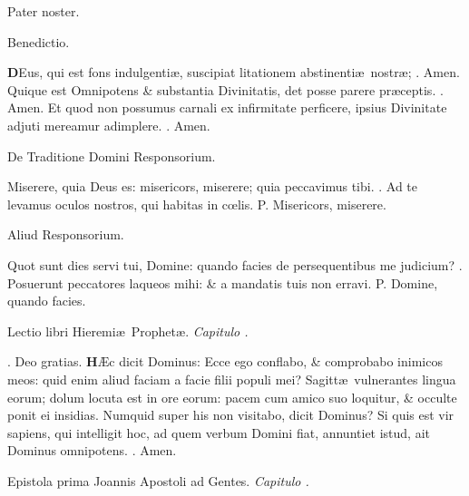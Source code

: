 \documentclass[letter,11pt]{book}
\makeatletter
\DeclareRobustCommand{\Vbar}{\vers@resp{-0.1em}{V}}
\DeclareRobustCommand{\Rbar}{\vers@resp{0pt}{R}}
\newcommand{\vers@resp@sym}{\raisebox{0.2ex}{\rotatebox[origin=c]{-20}{$\m@th\rceil$}}}
\newcommand{\vers@resp}[2]{%
  {\ooalign{\hidewidth\kern#1\vers@resp@sym\hidewidth\cr#2\cr}}%
}%
\def\P{\color{Red} P. \color{black}}
\def\V{\color{Red} \Vbar . \color{black}}
\def\R{\color{Red} \Rbar . \color{black}}
\makeatother
\begin{document}
\begin{multicols*}{2}
\par Pater noster.
\vspace{-.5em} \begin{center} \color{Red} Benedictio. \end{center} \vspace{-.5em}
\lettrine[lines=2]{\bfseries \color{Red} D}{}Eus, qui est fons indulgenti\ae , suscipiat litationem abstinenti\ae \ nostr\ae ;
\R Amen. Quique est Omnipotens \& substantia Divinitatis, det posse parere pr\ae ceptis. \R Amen. Et quod non possumus carnali ex infirmitate perficere, ipsius Divinitate adjuti mereamur adimplere. \R Amen.
\vspace{-.5em} \begin{center} \color{Red} De Traditione Domini Responsorium. \end{center} \vspace{-.5em}
\par \noindent Miserere, quia Deus es: misericors, miserere; quia peccavimus tibi. \V Ad te levamus oculos nostros, qui habitas in c\oe lis. \P Misericors, miserere.
\vspace{-.5em} \begin{center} \color{Red} Aliud Responsorium. \end{center} \vspace{-.5em}
\par \noindent Quot sunt dies servi tui, Domine: quando facies de persequentibus me judicium? \V Posuerunt peccatores laqueos mihi: \& a mandatis tuis non erravi. \P Domine, quando facies.
\vspace{-.5em} \begin{center} {\color{Red} L}ectio libri Hieremi\ae \ Prophet\ae . \itshape Capitulo . \end{center} \vspace{-.5em}
\par \noindent \R Deo gratias.
\lettrine[lines=2]{\bfseries \color{Red} H}{}\AE c dicit Dominus: Ecce ego conflabo, \& comprobabo inimicos meos: quid enim aliud faciam a facie filii populi mei? Sagitt\ae \ vulnerantes lingua eorum; dolum locuta est in ore eorum: pacem cum amico suo loquitur, \& occulte ponit ei insidias. Numquid super his non visitabo, dicit Dominus? Si quis est vir sapiens, qui intelligit hoc, ad quem verbum Domini fiat, annuntiet istud, ait Dominus omnipotens. \R Amen.
\vspace{-.5em} \begin{center} {\color{Red} E}pistola prima Joannis Apostoli ad Gentes. \itshape Capitulo . \end{center} \vspace{-.5em}

\end{multicols*}
\end{document}
